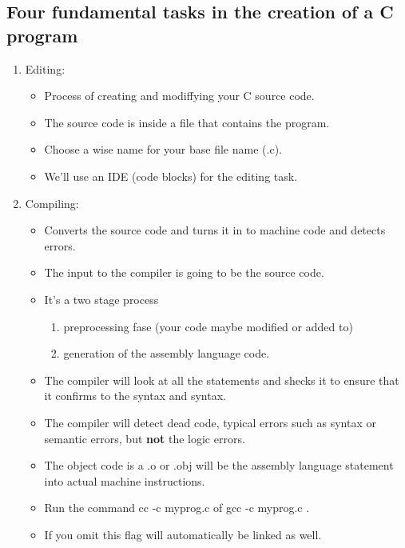 \subsection{Four fundamental tasks in the creation of a C program}
\begin{enumerate}
    \item Editing: 
        \begin{itemize}
            \item Process of creating and modiffying your C source code.
            \item The source code is inside a file that contains the program.
            \item Choose a wise name for your base file name (.c).
            \item We'll use an IDE (code blocks) for the editing task. 
        \end{itemize}

    \item Compiling: 
        \begin{itemize}
            \item Converts the source code and turns it in to machine code and detects errors.
            \item The input to the compiler is going to be the source code.
            \item It's a two stage process
            \begin{enumerate}
                \item preprocessing fase (your code maybe modified or added to) 
                \item generation of the assembly language code.
            \end{enumerate} 
            \item The compiler will look at all the statements and shecks it to ensure that it confirms to the syntax and syntax.
            \item The compiler will detect dead code, typical errors such as syntax or semantic errors, but \textbf{not} the logic errors.
            \item The object code is a .o or .obj will be the assembly language statement into actual machine instructions.
            \item Run the command cc -c myprog.c of gcc -c myprog.c .
            \item If you omit this flag will automatically be linked as well.
        \end{itemize}
        

\end{enumerate}
